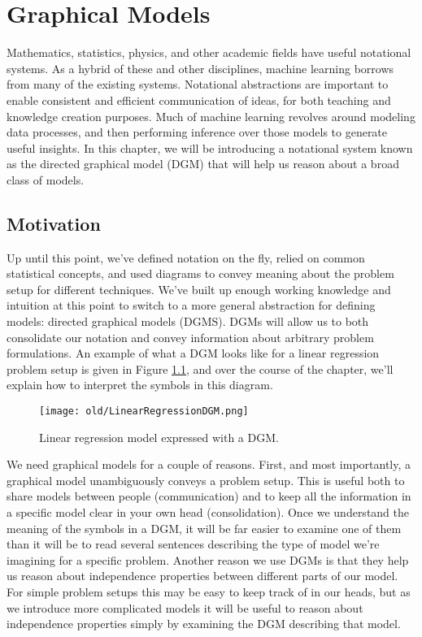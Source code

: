 \chapter{Graphical Models}
Mathematics, statistics, physics, and other academic fields have useful notational systems. As a hybrid of these and other disciplines, machine learning borrows from many of the existing systems. Notational abstractions are important to enable consistent and efficient communication of ideas, for both teaching and knowledge creation purposes. Much of machine learning revolves around modeling data processes, and then performing inference over those models to generate useful insights. In this chapter, we will be introducing a notational system known as the directed graphical model (DGM) that will help us reason about a broad class of models.

\section{Motivation}
Up until this point, we've defined notation on the fly, relied on common statistical concepts, and used diagrams to convey meaning about the problem setup for different techniques. We've built up enough working knowledge and intuition at this point to switch to a more general abstraction for defining models: directed graphical models (DGMS). DGMs will allow us to both consolidate our notation and convey information about arbitrary problem formulations. An example of what a DGM looks like for a linear regression problem setup is given in Figure \ref{fig:lin-reg-dgm}, and over the course of the chapter, we'll explain how to interpret the symbols in this diagram.
\begin{figure}
    \centering
    \texttt{[image: old/LinearRegressionDGM.png]}
    \caption{Linear regression model expressed with a DGM.}
    \label{fig:lin-reg-dgm}
\end{figure}

We need graphical models for a couple of reasons. First, and most importantly, a graphical model unambiguously conveys a problem setup. This is useful both to share models between people (communication) and to keep all the information in a specific model clear in your own head (consolidation). Once we understand the meaning of the symbols in a DGM, it will be far easier to examine one of them than it will be to read several sentences describing the type of model we're imagining for a specific problem. Another reason we use DGMs is that they help us reason about independence properties between different parts of our model. For simple problem setups this may be easy to keep track of in our heads, but as we introduce more complicated models it will be useful to reason about independence properties simply by examining the DGM describing that model.

